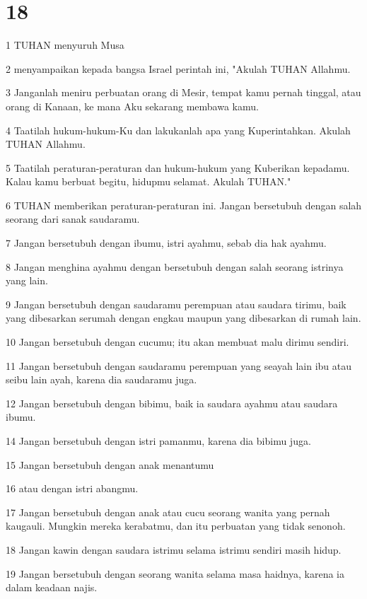 \chapter{18}

\par 1 TUHAN menyuruh Musa
\par 2 menyampaikan kepada bangsa Israel perintah ini, "Akulah TUHAN Allahmu.
\par 3 Janganlah meniru perbuatan orang di Mesir, tempat kamu pernah tinggal, atau orang di Kanaan, ke mana Aku sekarang membawa kamu.
\par 4 Taatilah hukum-hukum-Ku dan lakukanlah apa yang Kuperintahkan. Akulah TUHAN Allahmu.
\par 5 Taatilah peraturan-peraturan dan hukum-hukum yang Kuberikan kepadamu. Kalau kamu berbuat begitu, hidupmu selamat. Akulah TUHAN."
\par 6 TUHAN memberikan peraturan-peraturan ini. Jangan bersetubuh dengan salah seorang dari sanak saudaramu.
\par 7 Jangan bersetubuh dengan ibumu, istri ayahmu, sebab dia hak ayahmu.
\par 8 Jangan menghina ayahmu dengan bersetubuh dengan salah seorang istrinya yang lain.
\par 9 Jangan bersetubuh dengan saudaramu perempuan atau saudara tirimu, baik yang dibesarkan serumah dengan engkau maupun yang dibesarkan di rumah lain.
\par 10 Jangan bersetubuh dengan cucumu; itu akan membuat malu dirimu sendiri.
\par 11 Jangan bersetubuh dengan saudaramu perempuan yang seayah lain ibu atau seibu lain ayah, karena dia saudaramu juga.
\par 12 Jangan bersetubuh dengan bibimu, baik ia saudara ayahmu atau saudara ibumu.
\par 14 Jangan bersetubuh dengan istri pamanmu, karena dia bibimu juga.
\par 15 Jangan bersetubuh dengan anak menantumu
\par 16 atau dengan istri abangmu.
\par 17 Jangan bersetubuh dengan anak atau cucu seorang wanita yang pernah kaugauli. Mungkin mereka kerabatmu, dan itu perbuatan yang tidak senonoh.
\par 18 Jangan kawin dengan saudara istrimu selama istrimu sendiri masih hidup.
\par 19 Jangan bersetubuh dengan seorang wanita selama masa haidnya, karena ia dalam keadaan najis.
